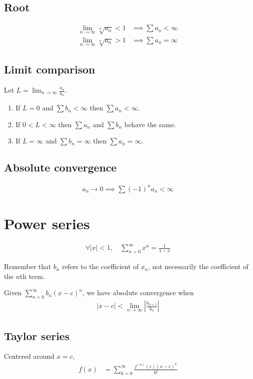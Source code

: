 \documentclass[12pt]{article}
\newcommand{\abs}  [1]{\left|       #1 \right|      }
\begin{document}
\begin{multicols}{2}
\subsection*{Root}
\begin{align*}
    \lim_{n\to\infty} \sqrt[n]{a_n} < 1 &\implies \sum a_n < \infty \\
    \lim_{n\to\infty} \sqrt[n]{a_n} > 1 &\implies \sum a_n = \infty
\end{align*}

\subsection*{Limit comparison}
Let $L = \lim_{n\to\infty} \frac{a_n}{b_n}$.
\begin{enumerate}
    \item If $L=0$ and $\sum b_n < \infty$ then $\sum a_n < \infty$.
    \item If $0<L<\infty$ then $\sum a_n$ and $\sum b_n$ behave the same.
    \item If $L=\infty$ and $\sum b_n = \infty$ then $\sum a_n = \infty$.
\end{enumerate}

\subsection*{Absolute convergence}
\begin{align*}
    a_n \to 0 \implies \sum (-1)^{n} a_n < \infty
\end{align*}



\section*{Power series}
\begin{align*}
    \forall \abs{x} < 1,\quad \sum_{n=0}^\infty x^n = \frac{1}{1-x}
\end{align*}

Remember that $b_n$ refers to the coefficient of $x_n$, not necessarily the coefficient of the $n$th term.

Given $\sum_{n=0}^\infty b_n (x-c)^n$, we have absolute convergence when
\begin{align*}
    \abs{x-c} < \lim_{n\to\infty} \abs{\frac{b_{n+1}}{b_n}}
\end{align*}

\subsection*{Taylor series}
Centered around $x=c$,
\begin{align*}
    f(x) &= \sum_{k=0}^\infty \frac{f^{(n)}(c) (x-c)^k}{k!}
\end{align*}

\end{multicols}
\end{document}
